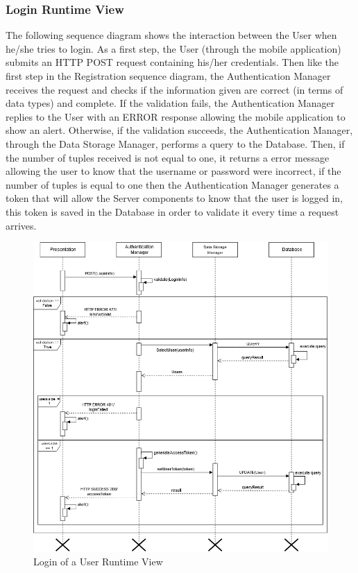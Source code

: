 \subsubsection{Login Runtime View}
The following sequence diagram shows the interaction between the User when he/she tries to login.\newline
As a first step, the User (through the mobile application) submits an HTTP POST request containing his/her credentials. Then like the first step in the Registration sequence diagram, the Authentication Manager receives the request and checks if the information given are correct (in terms of data types) and complete.\newline
If the validation fails, the Authentication Manager replies to the User with an ERROR response allowing the mobile application to show an alert.\newline
Otherwise, if the validation succeeds, the Authentication Manager, through the Data Storage Manager, performs a query to the Database. Then, if the number of tuples received is not equal to one, it returns a error message allowing the user to know that the username or password were incorrect, if the number of tuples is equal to one then the Authentication Manager generates a token that will allow the Server components to know that the user is logged in, this token is saved in the Database in order to validate it every time a request arrives. 

\begin{figure}[H]
          \includegraphics[scale=0.5]{Images/seq_login_definitivo.png}
        \caption{Login of a User Runtime View}
\end{figure}

